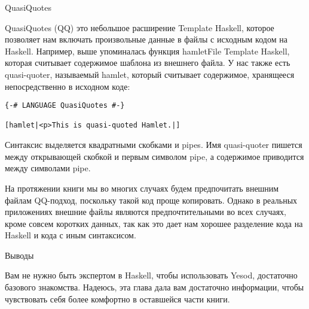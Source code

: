 QuasiQuotes

QuasiQuotes (QQ) это небольшое расширение Template Haskell, которое позволяет нам включать произвольные данные в файлы с исходным кодом на Haskell. Например, выше упоминалась функция hamletFile Template Haskell, которая считывает содержимое шаблона из внешнего файла. У нас также есть quasi-quoter, называемый hamlet, который считывает содержимое, хранящееся непосредственно в исходном коде:

\begin{verbatim}
{-# LANGUAGE QuasiQuotes #-}

[hamlet|<p>This is quasi-quoted Hamlet.|]
\end{verbatim}

Синтаксис выделяется квадратными скобками и pipes. Имя quasi-quoter пишется между открывающей скобкой и первым символом pipe, а содержимое приводится между символами pipe.

На протяжении книги мы во многих случаях будем предпочитать внешним файлам QQ-подход, поскольку такой код проще копировать. Однако в реальных приложениях внешние файлы являются предпочтительными во всех случаях, кроме совсем коротких данных, так как это дает нам хорошее разделение кода на Haskell и кода с иным синтаксисом.

Выводы

Вам не нужно быть экспертом в Haskell, чтобы использовать Yesod, достаточно базового знакомства. Надеюсь, эта глава дала вам достаточно информации, чтобы чувствовать себя более комфортно в оставшейся части книги.